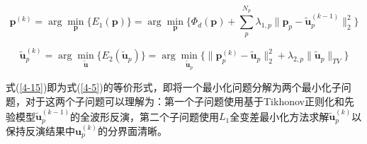 \documentclass[12pt]{article}
\begin{document}
\begin{equation}\label{4-14}
\boldsymbol{p}^{(k)}=\arg\min_{\boldsymbol{p}}\{E_1(\boldsymbol{p})\}=\arg\min_{\boldsymbol{p}}
\{\Phi_d(\boldsymbol{p})+\sum_p^{N_p}\lambda_{1,p}\parallel \boldsymbol{p}_p-\tilde{\boldsymbol{u}}_p^{(k-1)}\parallel_{2}^{2}\}
\end{equation}
\par
\begin{equation}\label{4-15}
\tilde{\boldsymbol{u}}_p^{(k)}=\arg\min_{\tilde{\boldsymbol{u}}}\{E_2(\tilde{\boldsymbol{u}}_p)\}=\arg\min_{\tilde{\boldsymbol{u}}_p}\{\parallel \boldsymbol{p}_p^{(k)}-\tilde{\boldsymbol{u}}_p\parallel_2^2+\lambda_{2,p}\parallel\tilde{\boldsymbol{u}}_p\parallel_{TV}\}
\end{equation}
\par
式(\ref{4-15})即为式(\ref{4-5})的等价形式，即将一个最小化问题分解为两个最小化子问题，对于这两个子问题可以理解为：第一个子问题使用基于Tikhonov正则化和先验模型$\tilde{\boldsymbol{u}}_p^{(k-1)}$的全波形反演，第二个子问题使用$L_1$全变差最小化方法求解$\tilde{\boldsymbol{u}}_p^{(k)}$以保持反演结果中$\boldsymbol{u}_p^{(k)}$的分界面清晰。
\par
\end{document}
